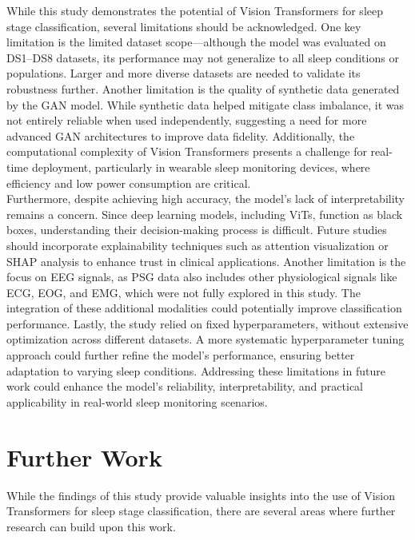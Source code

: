 While this study demonstrates the potential of Vision Transformers for sleep stage classification, several limitations should be acknowledged. One key limitation is the limited dataset scope—although the model was evaluated on DS1–DS8 datasets, its performance may not generalize to all sleep conditions or populations. Larger and more diverse datasets are needed to validate its robustness further. Another limitation is the quality of synthetic data generated by the GAN model. While synthetic data helped mitigate class imbalance, it was not entirely reliable when used independently, suggesting a need for more advanced GAN architectures to improve data fidelity. Additionally, the computational complexity of Vision Transformers presents a challenge for real-time deployment, particularly in wearable sleep monitoring devices, where efficiency and low power consumption are critical. \\

Furthermore, despite achieving high accuracy, the model's lack of interpretability remains a concern. Since deep learning models, including ViTs, function as black boxes, understanding their decision-making process is difficult. Future studies should incorporate explainability techniques such as attention visualization or SHAP analysis to enhance trust in clinical applications. Another limitation is the focus on EEG signals, as PSG data also includes other physiological signals like ECG, EOG, and EMG, which were not fully explored in this study. The integration of these additional modalities could potentially improve classification performance. Lastly, the study relied on fixed hyperparameters, without extensive optimization across different datasets. A more systematic hyperparameter tuning approach could further refine the model’s performance, ensuring better adaptation to varying sleep conditions. Addressing these limitations in future work could enhance the model’s reliability, interpretability, and practical applicability in real-world sleep monitoring scenarios.

\section{Further Work}

While the findings of this study provide valuable insights into the use of Vision Transformers for sleep stage classification, there are several areas where further research can build upon this work.


